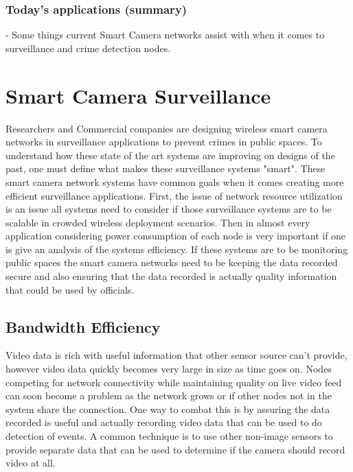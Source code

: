 \documentclass[journal,transmag]{IEEEtran}
\begin{document}
\subsubsection{Today's applications (summary)}
\-- Some things current Smart Camera networks assist with when it comes to 
surveillance and crime detection nodes. \\


\section{Smart Camera Surveillance}
Researchers and Commercial companies are designing wireless smart camera networks in surveillance applications to prevent crimes in public spaces. To
understand how these state of the art systems are improving on designs of the past, one must define what makes these surveillance systems "smart". 
These smart camera network systems have common goals when it comes creating more efficient surveillance applications. First, the issue of network
resource utilization is an issue all systems need to consider if those surveillance systems are to be scalable in crowded wireless deployment 
scenarios. Then in almost every application considering power consumption of each node is very important if one is give an analysis of the systems 
efficiency. If these systems are to be monitoring public spaces the smart camera networks need to be keeping the data recorded secure and also ensuring 
that the data recorded is actually quality information that could be used by officials. \\


\subsection{Bandwidth Efficiency}
Video data is rich with useful information that other sensor source can’t provide, however video data quickly becomes very large in size as time goes on.
Nodes competing for network connectivity while maintaining quality on live video feed can soon become a problem as the network grows or if other nodes
not in the system share the connection. One way to combat this is by assuring the data recorded is useful and actually recording video data that can be
used to do detection of events. A common technique is to use other non-image sensors to provide separate data that can be used to determine if the camera
should record video at all.
\end{document}
